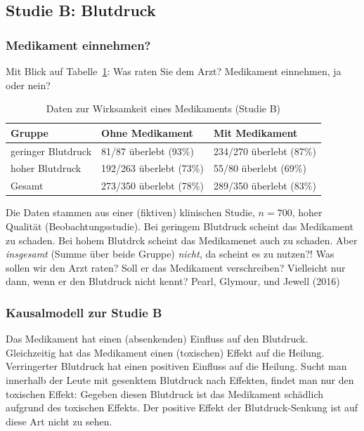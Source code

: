 \documentclass[
  a4paper,
  DIV=11]{scrreprt}
\theoremstyle{definition}
\theoremstyle{remark}
\begin{document}
\hypertarget{studie-b-blutdruck}{%
\subsection{Studie B: Blutdruck}\label{studie-b-blutdruck}}

\hypertarget{medikament-einnehmen-1}{%
\subsubsection{Medikament einnehmen?}\label{medikament-einnehmen-1}}

Mit Blick auf Tabelle~\ref{tbl-studie-b}: Was raten Sie dem Arzt?
Medikament einnehmen, ja oder nein?

\hypertarget{tbl-studie-b}{}
\begin{longtable}{lll}
\caption{\label{tbl-studie-b}Daten zur Wirksamkeit eines Medikaments (Studie B) }\tabularnewline

\toprule
Gruppe & Ohne Medikament & Mit Medikament \\ 
\midrule
geringer Blutdruck & 81/87 überlebt (93\%) & 234/270 überlebt (87\%) \\ 
hoher Blutdruck & 192/263 überlebt (73\%) & 55/80 überlebt (69\%) \\ 
Gesamt & 273/350 überlebt (78\%) & 289/350 überlebt (83\%) \\ 
\bottomrule
\end{longtable}

Die Daten stammen aus einer (fiktiven) klinischen Studie, \(n=700\),
hoher Qualität (Beobachtungsstudie). Bei geringem Blutdruck scheint das
Medikament zu schaden. Bei hohem Blutdrck scheint das Medikamenet auch
zu schaden. Aber \emph{insgesamt} (Summe über beide Gruppe)
\emph{nicht}, da scheint es zu nutzen?! Was sollen wir den Arzt raten?
Soll er das Medikament verschreiben? Vielleicht nur dann, wenn er den
Blutdruck nicht kennt? Pearl, Glymour, und Jewell (2016)

\hypertarget{kausalmodell-zur-studie-b}{%
\subsubsection{Kausalmodell zur Studie
B}\label{kausalmodell-zur-studie-b}}

Das Medikament hat einen (absenkenden) Einfluss auf den Blutdruck.
Gleichzeitig hat das Medikament einen (toxischen) Effekt auf die
Heilung. Verringerter Blutdruck hat einen positiven Einfluss auf die
Heilung. Sucht man innerhalb der Leute mit gesenktem Blutdruck nach
Effekten, findet man nur den toxischen Effekt: Gegeben diesen Blutdruck
ist das Medikament schädlich aufgrund des toxischen Effekts. Der
positive Effekt der Blutdruck-Senkung ist auf diese Art nicht zu sehen.
\end{document}

